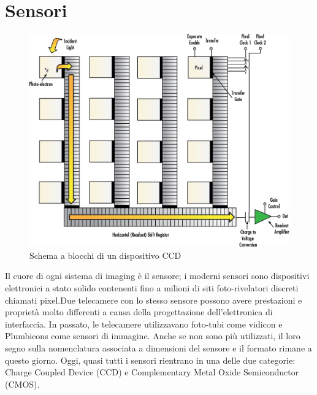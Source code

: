 

\section{Sensori}


\begin{figure}[!ht]
\centering

\includegraphics[width=\textwidth]{img/ccd-blockdiagram.jpeg}

\caption{Schema a blocchi di un dispositivo CCD}
\label{fig:ccd-blockdiagram}
\end{figure}

Il cuore di ogni sistema di imaging è il sensore; i moderni sensori sono
dispositivi elettronici a stato solido contenenti fino a milioni di siti
foto-rivelatori discreti chiamati pixel.Due telecamere con lo stesso sensore
possono avere prestazioni e proprietà molto differenti a causa della
progettazione dell'elettronica di interfaccia. In passato, le telecamere
utilizzavano foto-tubi come vidicon e Plumbicons come sensori di immagine.
Anche se non sono più utilizzati, il loro segno sulla nomenclatura associata a
dimensioni del sensore e il formato rimane a questo giorno. Oggi, quasi tutti
i sensori rientrano in una delle due categorie: Charge Coupled Device (CCD) e
Complementary Metal Oxide Semiconductor (CMOS).


